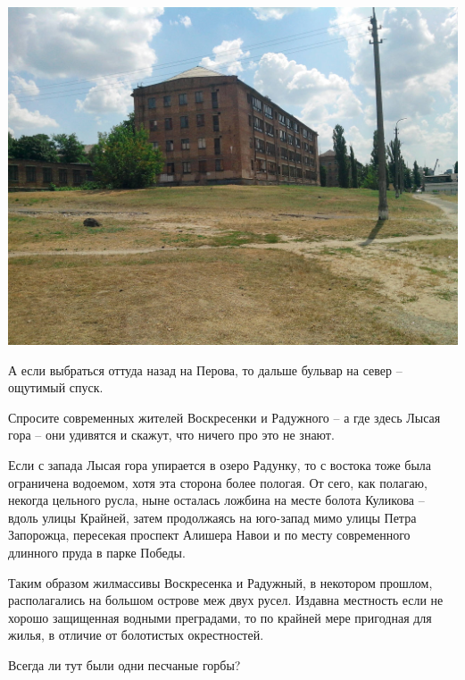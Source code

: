 \begin{center}
\includegraphics[width=\textwidth]{chast-gorodki/lysaya/s_IMG_20140806_124639.jpg}
\end{center}
\vspace*{\fill}
\newpage

А если выбраться оттуда назад на Перова, то дальше бульвар на север – ощутимый спуск. 

Спросите современных жителей Воскресенки и Радужного – а где здесь Лысая гора – они удивятся и скажут, что ничего про это не знают. 

Если с запада Лысая гора упирается в озеро Радунку, то с востока тоже была ограничена водоемом, хотя эта сторона более пологая. От сего, как полагаю, некогда цельного русла, ныне осталась ложбина на месте болота Куликова – вдоль улицы Крайней, затем продолжаясь на юго-запад мимо улицы Петра Запорожца, пересекая проспект Алишера Навои и по месту современного длинного пруда в парке Победы.

Таким образом жилмассивы Воскресенка и Радужный, в некотором прошлом, располагались на большом острове меж двух русел. Издавна местность если не хорошо защищенная водными преградами, то по крайней мере пригодная для жилья, в отличие от болотистых окрестностей.

Всегда ли тут были одни песчаные горбы?